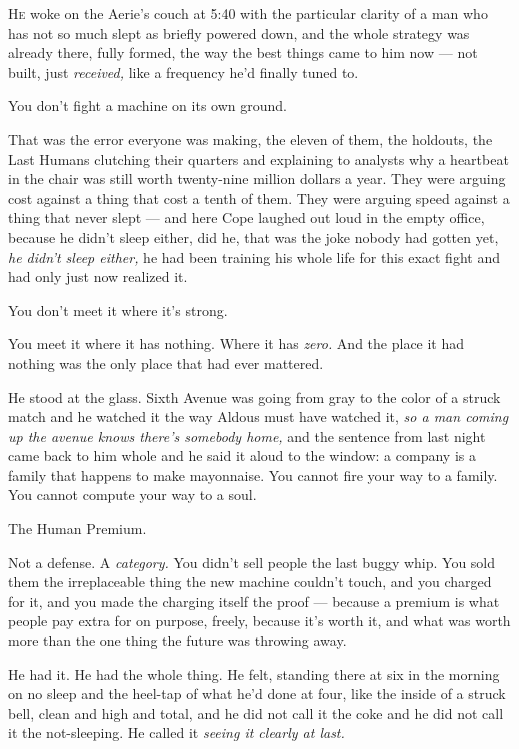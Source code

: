 \documentclass[11pt,openany]{book}
\begin{document}
\lettrine[lines=3, lhang=0.05, nindent=0.25em]{H}{e} woke on the Aerie's couch at 5:40 with the particular clarity of a man who has not so much slept as briefly powered down, and the whole strategy was already there, fully formed, the way the best things came to him now --- not built, just \textit{received,} like a frequency he'd finally tuned to.

You don't fight a machine on its own ground.

That was the error everyone was making, the eleven of them, the holdouts, the Last Humans clutching their quarters and explaining to analysts why a heartbeat in the chair was still worth twenty-nine million dollars a year. They were arguing cost against a thing that cost a tenth of them. They were arguing speed against a thing that never slept --- and here Cope laughed out loud in the empty office, because he didn't sleep either, did he, that was the joke nobody had gotten yet, \textit{he didn't sleep either,} he had been training his whole life for this exact fight and had only just now realized it.

You don't meet it where it's strong.

You meet it where it has nothing. Where it has \textit{zero.} And the place it had nothing was the only place that had ever mattered.

He stood at the glass. Sixth Avenue was going from gray to the color of a struck match and he watched it the way Aldous must have watched it, \textit{so a man coming up the avenue knows there's somebody home,} and the sentence from last night came back to him whole and he said it aloud to the window: a company is a family that happens to make mayonnaise. You cannot fire your way to a family. You cannot compute your way to a soul.

The Human Premium.

Not a defense. A \textit{category.} You didn't sell people the last buggy whip. You sold them the irreplaceable thing the new machine couldn't touch, and you charged for it, and you made the charging itself the proof --- because a premium is what people pay extra for on purpose, freely, because it's worth it, and what was worth more than the one thing the future was throwing away.

He had it. He had the whole thing. He felt, standing there at six in the morning on no sleep and the heel-tap of what he'd done at four, like the inside of a struck bell, clean and high and total, and he did not call it the coke and he did not call it the not-sleeping. He called it \textit{seeing it clearly at last.}
\end{document}
